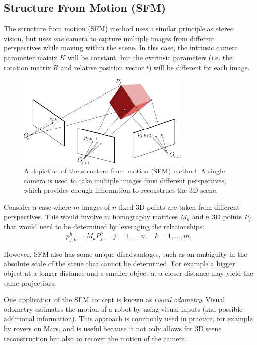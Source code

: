 \subsection{Structure From Motion (SFM)}
The structure from motion (SFM) method uses a similar principle as stereo vision, but uses \textit{one} camera to capture multiple images from different perspectives while moving within the scene. In this case, the intrinsic camera parameter matrix $K$ will be constant, but the extrinsic parameters (i.e. the rotation matrix $R$ and relative position vector $t$) will be different for each image.
\begin{figure}[ht]
  \begin{center}
	\includegraphics[width=0.75\textwidth]{tex/figs/ch10_figs/sfm.png}  \end{center}
  \caption{A depiction of the structure from motion (SFM) method. A single camera is used to take multiple images from different perspectives, which provides enough information to reconstruct the 3D scene.}
  \label{sfm}
\end{figure}
Consider a case where $m$ images of $n$ fixed 3D points are taken from different perspectives. This would involve $m$ homography matrices $M_k$ and $n$ 3D points $P_j$ that would need to be determined by leveraging the relationships:
\begin{equation*}
    p_{j,k}^h = M_k P^h_j, \quad j = 1,\dots,n, \quad k=1,\dots,m.
\end{equation*}

However, SFM also has some unique disadvantages, such as an ambiguity in the absolute scale of the scene that cannot be determined. For example a bigger object at a longer distance and a smaller object at a closer distance may yield the same projections.

One application of the SFM concept is known as \textit{visual odometry}. Visual odometry estimates the motion of a robot by using visual inputs (and possible additional information). This approach is commonly used in practice, for example by rovers on Mars, and is useful because it not only allows for 3D scene reconstruction but also to recover the motion of the camera.

